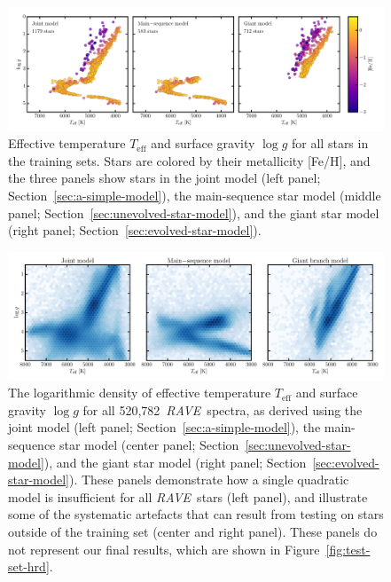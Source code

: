 \documentclass[preprint,trackchanges]{aastex}
\newcommand{\acronym}[1]{{\small{#1}}}
\newcommand{\project}[1]{\textsl{#1}}
\newcommand{\rave}{\project{\acronym{RAVE}}}
\newcommand{\teff}{T_{\mathrm{eff}}}
\newcommand{\logg}{\log g}
\newcommand{\Nspectra}{520,782}
\begin{document}
\clearpage

\begin{figure}[p]
\includegraphics[width=\textwidth]{figures/hrd-train-set.pdf}
\caption{Effective temperature $\teff$ and surface gravity $\logg$ for all stars in the training sets. Stars are colored by their metallicity [Fe/H], and the three panels show stars in the joint model (left panel; Section~\ref{sec:a-simple-model}), the main-sequence star model (middle panel; Section~\ref{sec:unevolved-star-model}), and the giant star model (right panel; Section~\ref{sec:evolved-star-model}).\label{fig:training-set-hrd}}
\end{figure}



\begin{figure}[p]
\includegraphics[width=\textwidth]{figures/test-set-density.pdf}
\caption{The logarithmic density of effective temperature $\teff$ and surface gravity $\logg$ for all \Nspectra\ \rave\ spectra, as derived using the joint model (left panel; Section~\ref{sec:a-simple-model}), the main-sequence star model (center panel; Section~\ref{sec:unevolved-star-model}), and the giant star model (right panel; Section~\ref{sec:evolved-star-model}). These panels demonstrate how a single quadratic model is insufficient for all \rave\ stars (left panel), and illustrate some of the systematic artefacts that can result from testing on stars outside of the training set (center and right panel).  These panels do not represent our final results, which are shown in Figure~\ref{fig:test-set-hrd}.\label{fig:test-set-density}}
\end{figure}
\end{document}
